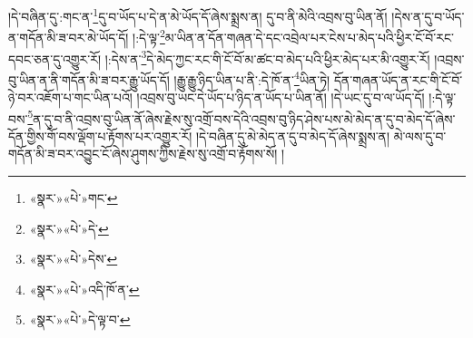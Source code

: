 །དེ་བཞིན་དུ་:གང་ན་\footnote{«སྣར་»«པེ་»གང་}དུ་བ་ཡོད་པ་དེ་ན་མེ་ཡོད་དོ་ཞེས་སྨྲས་ན། དུ་བ་ནི་མེའི་འབྲས་བུ་ཡིན་ནོ། །དེས་ན་དུ་བ་ཡོད་ན་གདོན་མི་ཟ་བར་མེ་ཡོད་དོ། །:དེ་ལྟ་\footnote{«སྣར་»«པེ་»དེ་}མ་ཡིན་ན་དོན་གཞན་དེ་དང་འབྲེལ་པར་ངེས་པ་མེད་པའི་ཕྱིར་ངོ་བོ་རང་དབང་ཅན་དུ་འགྱུར་རོ། །:དེས་ན་\footnote{«སྣར་»«པེ་»དེས་}དེ་མེད་ཀྱང་རང་གི་ངོ་བོ་མ་ཚང་བ་མེད་པའི་ཕྱིར་མེད་པར་མི་འགྱུར་རོ། །འབྲས་བུ་ཡིན་ན་ནི་གདོན་མི་ཟ་བར་རྒྱུ་ཡོད་དོ། །རྒྱུ་རྒྱུ་ཉིད་ཡིན་པ་ནི་:དེ་ཁོ་ན་\footnote{«སྣར་»«པེ་»འདི་ཁོ་ན་}ཡིན་ཏེ། དོན་གཞན་ཡོད་ན་རང་གི་ངོ་བོ་ཉེ་བར་འཇོག་པ་གང་ཡིན་པའོ། །འབྲས་བུ་ཡང་དེ་ཡོད་པ་ཉིད་ན་ཡོད་པ་ཡིན་ནོ། །དེ་ཡང་དུ་བ་ལ་ཡོད་དོ། །:དེ་ལྟ་བས་\footnote{«སྣར་»«པེ་»དེ་ལྟ་བ་}ན་དུ་བ་ནི་འབྲས་བུ་ཡིན་ནོ་ཞེས་རྗེས་སུ་འགྲོ་བས་དེའི་འབྲས་བུ་ཉིད་ཤེས་པས་མེ་མེད་ན་དུ་བ་མེད་དོ་ཞེས་དོན་གྱིས་གོ་བས་ལྡོག་པ་རྟོགས་པར་འགྱུར་རོ། །དེ་བཞིན་དུ་མེ་མེད་ན་དུ་བ་མེད་དོ་ཞེས་སྨྲས་ན། མེ་ལས་དུ་བ་གདོན་མི་ཟ་བར་འབྱུང་ངོ་ཞེས་ཤུགས་ཀྱིས་རྗེས་སུ་འགྲོ་བ་རྟོགས་སོ། །
